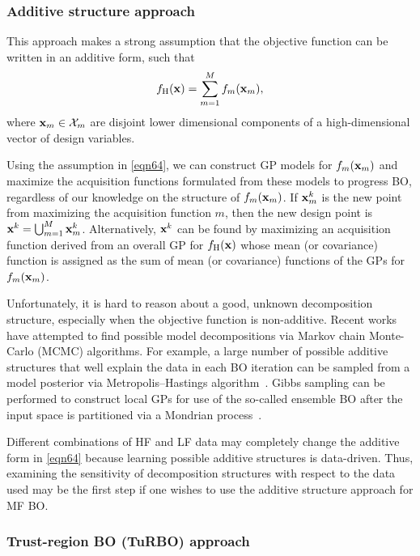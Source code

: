 \documentclass[journal ]{new-aiaa}
\begin{document}
	\subsubsection{Additive structure approach}\label{Sec622}
	
	This approach makes a strong assumption that the objective function can be written in an additive form, such that~\citep{Kandasamy2015}
	\begin{equation}\label{eqn64}
		f_\text{H}({\bf x}) = \sum_{m=1}^{M}f_m({\bf x}_m), 
	\end{equation}
	where ${\bf x}_m \in \mathcal{X}_m$ are disjoint lower dimensional components of a high-dimensional vector of design variables.
	
	Using the assumption in \cref{eqn64}, we can construct GP models for $f_m({\bf x}_m)$ and maximize the acquisition functions formulated from these models to progress BO, regardless of our knowledge on the structure of $f_m({\bf x}_m)$.
	If ${\bf x}^k_m$ is the new point from maximizing the acquisition function $m$, then the new design point is ${\bf x}^k = \bigcup_{m=1}^M {\bf x}^k_m$.
	Alternatively, ${\bf x}^k$ can be found by maximizing an acquisition function derived from an overall GP for $f_\text{H}({\bf x})$ whose mean (or covariance) function is assigned as the sum of mean (or covariance) functions of the GPs for $f_m({\bf x}_m)$. 
	
	Unfortunately, it is hard to reason about a good, unknown decomposition structure, especially when the objective function is non-additive. 
	Recent works have attempted to find possible model decompositions via Markov chain Monte-Carlo (MCMC) algorithms.
	For example, a large number of possible additive structures that well explain the data in each BO iteration can be sampled from a model posterior via Metropolis–Hastings algorithm~\citep{Gardner2017}. 
	Gibbs sampling can be performed to construct local GPs for use of the so-called ensemble BO after the input space is partitioned via a Mondrian process~\citep{WangZ2018}.
	
	Different combinations of HF and LF data may completely change the additive form in \cref{eqn64} because learning possible additive structures is data-driven.
	Thus, examining the sensitivity of decomposition structures with respect to the data used may be the first step if one wishes to use the additive structure approach for MF BO.
	
	\subsubsection{Trust-region BO (TuRBO) approach}\label{Sec623}
	
\end{document}
